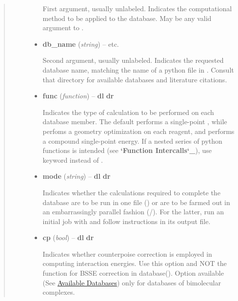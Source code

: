 \documentclass[letterpaper,10pt,english]{sphinxmanual}
\begin{document}
\begin{fulllineitems}
\begin{quote}
\begin{description}
\begin{itemize}
First argument, usually unlabeled. Indicates the computational method
to be applied to the database. May be any valid argument to
{\hyperref[db:driver.energy]{}}.


\item {} 
\textbf{db\_name} (\emph{string}) -- 
 \textbar{}\textbar{}  \textbar{}\textbar{}  \textbar{}\textbar{} etc.

Second argument, usually unlabeled. Indicates the requested database
name, matching the name of a python file in .
Consult that directory for available databases and literature citations.


\item {} 
\textbf{func} (\emph{function}) -- 
{\color{red}\bfseries{}\textbar{}dl\textbar{}}  {\color{red}\bfseries{}\textbar{}dr\textbar{}} \textbar{}\textbar{}  \textbar{}\textbar{} 

Indicates the type of calculation to be performed on each database
member. The default performs a single-point , while
 perfoms a geometry optimization on each reagent, and
 performs a compound single-point energy. If a nested series
of python functions is intended (see {\color{red}\bfseries{}{}`Function Intercalls{}`\_}), use
keyword  instead of .


\item {} 
\textbf{mode} (\emph{string}) -- 
{\color{red}\bfseries{}\textbar{}dl\textbar{}}  {\color{red}\bfseries{}\textbar{}dr\textbar{}} \textbar{}\textbar{}  \textbar{}\textbar{} 

Indicates whether the calculations required to complete the
database are to be run in one file () or are to be
farmed out in an embarrassingly parallel fashion
(/).  For the latter, run an initial job with
 and follow instructions in its output file.


\item {} 
\textbf{cp} (\emph{bool}) -- 
 \textbar{}\textbar{} {\color{red}\bfseries{}\textbar{}dl\textbar{}}  {\color{red}\bfseries{}\textbar{}dr\textbar{}}

Indicates whether counterpoise correction is employed in computing
interaction energies. Use this option and NOT the {\hyperref[db:wrappers.cp]{}}
function for BSSE correction in database().  Option available
(See {\hyperref[db:available-databases]{Available Databases}}) only for databases of bimolecular complexes.



\end{itemize}
\end{description}
\end{quote}
\end{fulllineitems}
\end{document}
